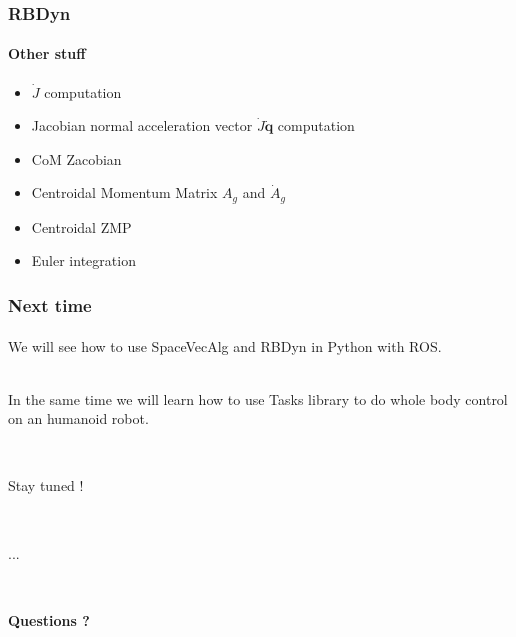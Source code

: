 \documentclass{beamer}
\begin{document}
	\begin{frame}
		\frametitle{RBDyn}
		\framesubtitle{Other stuff}
		\begin{itemize}
			\item $ \dot{J} $ computation
			\item Jacobian normal acceleration vector $ \dot{J}\dot{\mathbf{q}} $ computation
			\item CoM Zacobian
			\item Centroidal Momentum Matrix $ A_g $ and $ \dot{A}_g $
			\item Centroidal ZMP
			\item Euler integration
		\end{itemize}
	\end{frame}

	\begin{frame}
		\frametitle{Next time}
		\framesubtitle{}
		We will see how to use SpaceVecAlg and RBDyn in Python with ROS.
		
		\hfill \\
		In the same time we will learn how to use Tasks library to do whole body control on an humanoid robot.

		\hfill \\
		{\centering
		Stay tuned !\par}
		\hfil \\
		{\centering
		...\par}
		\hfill \\
		{\centering
		\bf{Questions} ?\par}
	\end{frame}
\end{document}
